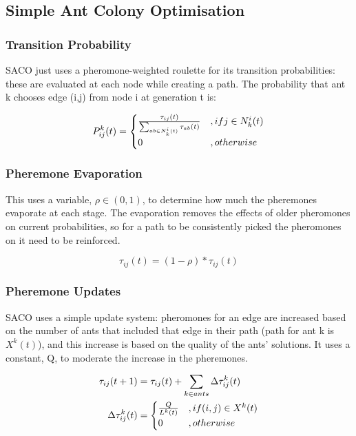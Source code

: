 \subsection{Simple Ant Colony Optimisation}

\subsubsection{Transition Probability}
SACO just uses a pheromone-weighted roulette for its transition probabilities: these are evaluated at each node while creating a path. The probability that ant k chooses edge (i,j) from node i at generation t is:

\begin{equation}
    P_{ij}^k(t) = 
    \begin{cases}
         $$ \frac{\tau_{ij}(t)}{\sum_{ab \in N^i_k(t)} \tau_{ab}(t)} $$ &, if $$ j \in N^i_k(t) $$ \\
        0 &, otherwise
    \end{cases}
\end{equation}

\subsubsection{Pheremone Evaporation}
This uses a variable, $\rho \in (0,1)$, to determine how much the pheremones evaporate at each stage. The evaporation removes the effects of older pheromones on current probabilities, so for a path to be consistently picked the pheromones on it need to be reinforced.

\begin{equation}
    \tau_{ij}(t) = (1-\rho) * \tau_{ij}(t)
\end{equation}

\subsubsection{Pheremone Updates}
SACO uses a simple update system: pheromones for an edge are increased based on the number of ants that included that edge in their path (path for ant k is $X^k(t)$), and this increase is based on the quality of the ants' solutions. It uses a constant, Q, to moderate the increase in the pheremones. 

\begin{align}
    \tau_{ij}(t+1) &= \tau_{ij}(t) + \sum_{k \in ants} \Delta \tau_{ij}^k(t) \\
    \Delta \tau_{ij}^k(t) &= 
    \begin{cases}
         $$ \frac{Q}{L^k(t)}  $$ &, if $$ (i,j) \in X^k(t) $$ \\ 
        0 &, otherwise
    \end{cases}    
\end{align}

